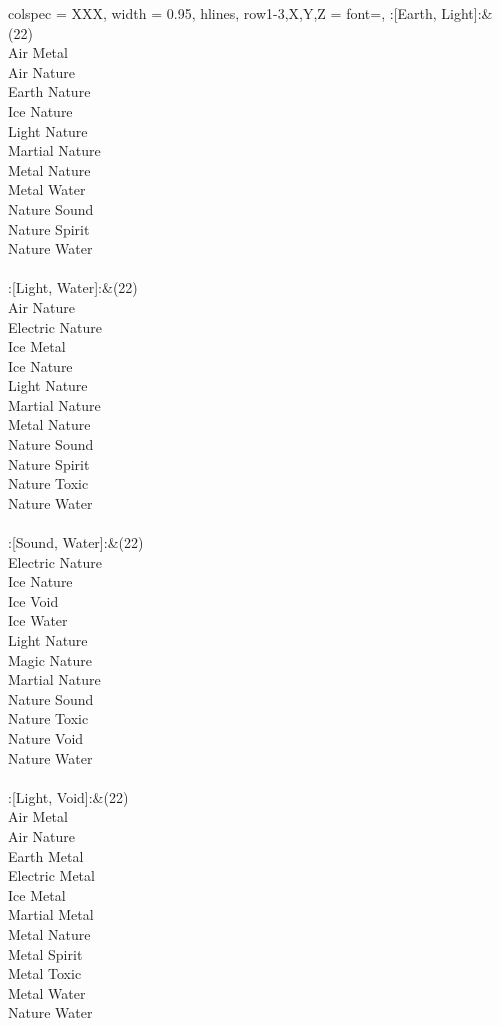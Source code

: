 \begin{longtblr}[
	caption = {2v2 Attacking Ineffective},
	label = {2v2-Attacking-Ineffective},
]{
	colspec = {XXX}, width = 0.95\linewidth,
	hlines,
	row{1-3,X,Y,Z} = {font=\bfseries},
}
	:[Earth, Light]:&{(22)\\
	Air Metal \\
	Air Nature \\
	Earth Nature \\
	Ice Nature \\
	Light Nature \\
	Martial Nature \\
	Metal Nature \\
	Metal Water \\
	Nature Sound \\
	Nature Spirit \\
	Nature Water \\
	}\\

	:[Light, Water]:&{(22)\\
	Air Nature \\
	Electric Nature \\
	Ice Metal \\
	Ice Nature \\
	Light Nature \\
	Martial Nature \\
	Metal Nature \\
	Nature Sound \\
	Nature Spirit \\
	Nature Toxic \\
	Nature Water \\
	}\\

	:[Sound, Water]:&{(22)\\
	Electric Nature \\
	Ice Nature \\
	Ice Void \\
	Ice Water \\
	Light Nature \\
	Magic Nature \\
	Martial Nature \\
	Nature Sound \\
	Nature Toxic \\
	Nature Void \\
	Nature Water \\
	}\\

	:[Light, Void]:&{(22)\\
	Air Metal \\
	Air Nature \\
	Earth Metal \\
	Electric Metal \\
	Ice Metal \\
	Martial Metal \\
	Metal Nature \\
	Metal Spirit \\
	Metal Toxic \\
	Metal Water \\
	Nature Water \\
	}\\


\end{longtblr}
